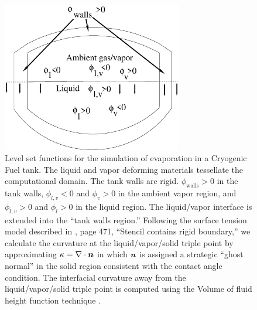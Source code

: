 \documentclass[]{article}
\newcommand{\bmn}{\mbox{\boldmath $n$\unboldmath}}
\begin{document}
\begin{figure}[htbp]
  \centering
    \includegraphics[width=0.7\textwidth]{tank_levelset.eps}
        \caption{Level set functions for the simulation of evaporation
        in a Cryogenic Fuel tank.  
        The liquid and vapor deforming
        materials tessellate the 
        computational domain.
        The tank walls are rigid.
        $\phi_{\mbox{walls}}>0$ in the tank walls,
        $\phi_{l,v}<0$ and $\phi_{v}>0$ 
        in the ambient vapor region, and
        $\phi_{l,v}>0$ and $\phi_{l}>0$
        in the liquid region.  The liquid/vapor interface
        is extended into the ``tank walls region.''
        Following the surface tension model described in
        \cite{li2015multiphase}, page 471, ``Stencil
        contains rigid boundary,'' we calculate the curvature
        at the liquid/vapor/solid triple point by approximating
        $\kappa=\nabla\cdot\bmn$ in which $\bmn$ is assigned 
        a strategic ``ghost normal'' in the solid region consistent
        with the contact angle condition. 
        The interfacial
        curvature away from the liquid/vapor/solid 
        triple point is computed using
        the Volume of fluid height function technique
        \cite{sussman2003second}.
    }
  \label{tank_levelset}
\end{figure}
\end{document}
